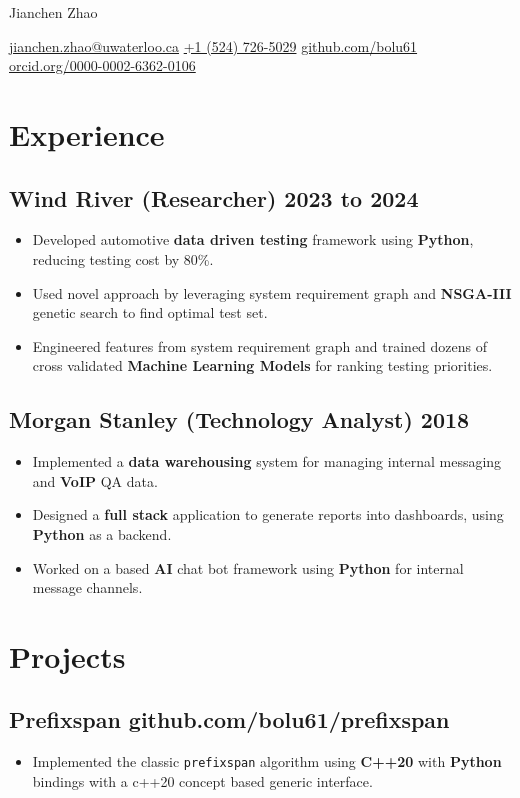 \documentclass[10pt,letterpaper]{article}
\newcommand{\datedsubsection}[2]{\subsection[#1]{#1 \hfill #2}}
\newcommand{\name}[1]{\centerline{\Huge{#1}}}
\newcommand{\contact}[1]{\centerline{#1}}
\newcommand{\sep}{{\large\textperiodcentered}}
\renewcommand{\emph}[1]{{\color{emphcolor}\bfseries#1}}
\begin{document}
\name{Jianchen Zhao}
\contact{\href{mailto:jianchen.zhao@uwaterloo.ca}{jianchen.zhao@uwaterloo.ca} \sep{} \href{tel:+15147265029}{+1 (524) 726-5029} \sep{} \href{https://github.com/bolu61}{github.com/bolu61} \sep{} \href{https://orcid.org/0000-0002-6362-0106}{orcid.org/0000-0002-6362-0106}}

\section{Experience}

\datedsubsection{Wind River (Researcher)}{2023 to 2024}
\begin{itemize}
    \item Developed automotive \emph{data driven testing} framework using \emph{Python}, reducing testing cost by 80\%.
    \item Used novel approach by leveraging system requirement graph and
    \emph{NSGA-III} genetic search to find optimal test set.
    \item Engineered features from system requirement graph and trained dozens of cross validated
    \emph{Machine Learning Models} for ranking testing priorities.
\end{itemize}

\datedsubsection{Morgan Stanley (Technology Analyst)}{2018}
\begin{itemize}
    \item Implemented a \emph{data warehousing} system for managing internal messaging and \emph{VoIP} QA data. 
    \item Designed a \emph{full stack} application to generate reports into
    dashboards, using \emph{Python} as a backend.
    \item Worked on a based \emph{AI} chat bot framework using \emph{Python} for
    internal message channels.
\end{itemize}

\section{Projects}
\subsection{Prefixspan github.com/bolu61/prefixspan}
\begin{itemize}
    \item Implemented the classic \verb|prefixspan| algorithm using \emph{C++20}
    with \emph{Python} bindings with a c++20 concept based generic interface.
\end{itemize}
\end{document}
